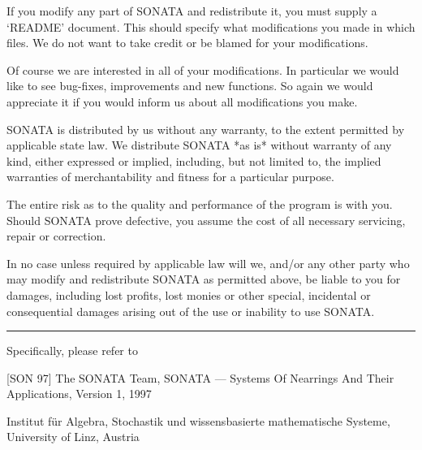 If you  modify any part of SONATA and redistribute it,  you must supply a
`README'  document.   This should specify what modifications you made  in
which  files.  We do  not  want  to take  credit  or  be blamed  for your
modifications.

Of course we are interested in all of your modifications.  In  particular
we would like to see bug-fixes, improvements and new functions.  So again
we would appreciate it if you would inform us about all modifications you
make.

SONATA is distributed by us without any warranty, to the extent permitted
by applicable state law.  We  distribute SONATA *as is* without  warranty
of any kind, either expressed or implied, including,  but not limited to,
the implied  warranties  of merchantability and  fitness for a particular
purpose.

The entire risk as to the quality and performance of the program is  with
you.  Should SONATA prove defective, you assume the cost of all necessary
servicing, repair or correction.

In no  case  unless  required by applicable law will we, and/or any other
party who  may  modify  and  redistribute  SONATA  as permitted above, be
liable  to you for damages, including lost profits, lost monies or  other
special, incidental or consequential damages  arising out  of the  use or
inability to use SONATA.

\vfill\hrule

\noindent\llap{\*\enspace}Specifically, please refer to

\smallskip \parindent4pc \parskip 0pt
\item{[SON 97]}
        The SONATA Team, SONATA --- Systems Of Nearrings And Their
        Applications, Version 1, 1997
\item{} Institut f\"ur Algebra, Stochastik und wissensbasierte
        mathematische Systeme,\hfill\break
        University of Linz, Austria

\endgroup



